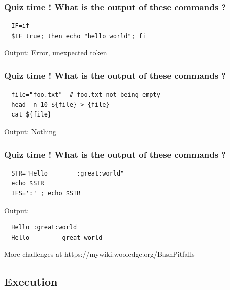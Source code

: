 \documentclass[aspectratio=169,10pt]{beamer}
\begin{document}

\begin{frame}[fragile]
  \frametitle{Quiz time ! What is the output of these commands ?}  %

  \begin{lstlisting}
  IF=if
  $IF true; then echo "hello world"; fi
  \end{lstlisting}

  \pause
  Output: Error, unexpected token

\end{frame}

\begin{frame}[fragile]
  \frametitle{Quiz time ! What is the output of these commands ?}

  \begin{lstlisting}
  file="foo.txt"  # foo.txt not being empty
  head -n 10 ${file} > {file}
  cat ${file}
  \end{lstlisting}

  \pause
  Output: Nothing
\end{frame}

\begin{frame}[fragile]
  \frametitle{Quiz time ! What is the output of these commands ?}

  \begin{lstlisting}
  STR="Hello        :great:world"
  echo $STR
  IFS=':' ; echo $STR
  \end{lstlisting}

  \pause
  Output:
  \begin{verbatim}
  Hello :great:world
  Hello         great world
  \end{verbatim}

  More challenges at https://mywiki.wooledge.org/BashPitfalls
\end{frame}


\subsection{Execution}
\end{document}
